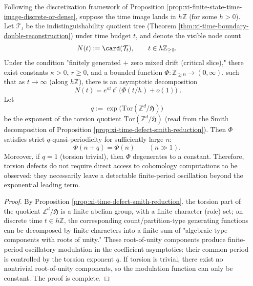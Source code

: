 \begin{theorem}\label{thm:xi-time-torsion-spectral-fingerprint}
Following the discretization framework of Proposition \ref{prop:xi-finite-state-time-image-discrete-or-dense}, suppose the time image lands in \(h\mathbb Z\) (for some \(h>0\)).
Let \(\mathcal T_t\) be the indistinguishability quotient tree (Theorem \ref{thm:xi-time-boundary-double-reconstruction}) under time budget \(t\), and denote the visible node count
\[
N(t):=\card(\mathcal T_t),\qquad t\in h\mathbb Z_{\ge 0}.
\]
Under the condition "finitely generated + zero mixed drift (critical slice)," there exist constants \(\kappa>0\), \(r\ge 0\), and a bounded function \(\Phi:\mathbb Z_{\ge 0}\to(0,\infty)\), such that as \(t\to\infty\) (along \(h\mathbb Z\)), there is an asymptotic decomposition
\[
\boxed{\;
N(t)=e^{\kappa t}\,t^{r}\,\bigl(\Phi(t/h)+o(1)\bigr)\; }.
\]
Let
\[
q:=\exp\!\bigl(\mathrm{Tor}(\mathbb Z^d/\mathfrak H)\bigr)
\]
be the exponent of the torsion quotient \(\mathrm{Tor}(\mathbb Z^d/\mathfrak H)\) (read from the Smith decomposition of Proposition \ref{prop:xi-time-defect-smith-reduction}).
Then \(\Phi\) satisfies strict \(q\)-quasi-periodicity for sufficiently large \(n\):
\[
\Phi(n+q)=\Phi(n)\qquad(n\gg 1).
\]
Moreover, if \(q=1\) (torsion trivial), then \(\Phi\) degenerates to a constant.
Therefore, torsion defects do not require direct access to cohomology computations to be observed: they necessarily leave a detectable finite-period oscillation beyond the exponential leading term.
\end{theorem}
\begin{proof}
By Proposition \ref{prop:xi-time-defect-smith-reduction}, the torsion part of the quotient \(\mathbb Z^d/\mathfrak H\) is a finite abelian group, with a finite character (role) set; on discrete time \(t\in h\mathbb Z\), the corresponding count/partition-type generating functions can be decomposed by finite characters into a finite sum of "algebraic-type components with roots of unity."
These root-of-unity components produce finite-period oscillatory modulation in the coefficient asymptotics; their common period is controlled by the torsion exponent \(q\).
If torsion is trivial, there exist no nontrivial root-of-unity components, so the modulation function can only be constant. The proof is complete.
\end{proof}

